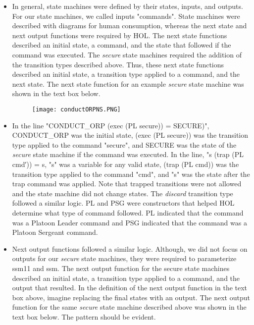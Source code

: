 \begin{itemize}
\item In general, state machines were defined by their states, inputs, and outputs.
  For our state machines, we called inputs "commands".  State machines were described
  with diagrams for human consumption, whereas the next state and next output functions
  were required by HOL.  The next state functions described an initial state, a command,
  and the state that followed if the command was executed.  The \textit{secure} state
  machines required the addition of the transition types described above.  Thus, these
  next state functions described an initial state, a transition type applied to a command,
  and the next state.  The next state function for an example \textit{secure} state machine
  was shown in the text box below.
  \begin{figure}[h]
  \centering
  \texttt{[image: conductORPNS.PNG]}
\end{figure}
\item In the line "CONDUCT_ORP (exec (PL secure)) = SECURE)", CONDUCT_ORP was the initial state,
  (exec (PL secure)) was the transition type applied to the command "secure", and SECURE was the
  state of the \textit{secure} state machine if the command was executed.  In the line,
  "s (trap (PL cmd′)) = s, "s" was a variable for any valid state, (trap (PL cmd)) was the
  transition type applied to the command "cmd", and "s" was the state after the trap command
  was applied.  Note that trapped transitions were not allowed and the state machine did not
  change states.  The \textit{discard} transition type followed a similar logic.  PL and PSG
  were constructors that helped HOL determine what type of command followed. PL indicated that
  the command was a Platoon Leader command and PSG indicated that the command was a Platoon Sergeant command.
\item Next output functions followed a similar logic.  Although, we did not focus on
  outputs for our \textit{secure} state machines, they were required to parameterize ssm11
  and ssm.  The next output function for the secure state machines described an initial state,
  a transition type applied to a command, and the output that resulted.  In the definition of
  the next output function in the text box above, imagine replacing the final states with an
  output.    The next output function for the same \textit{secure} state machine described
  above was shown in the text box below.   The pattern should be evident.\\\\\\\\\\\\

\end{itemize}
